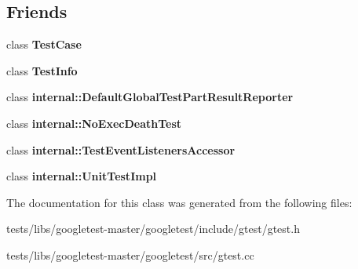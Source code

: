 \subsection*{Friends}
\begin{DoxyCompactItemize}
\item 
\mbox{\label{classtesting_1_1TestEventListeners_aff779e55b06adfa7c0088bd10253f0f0}} 
class {\bfseries Test\+Case}
\item 
\mbox{\label{classtesting_1_1TestEventListeners_a4c49c2cdb6c328e6b709b4542f23de3c}} 
class {\bfseries Test\+Info}
\item 
\mbox{\label{classtesting_1_1TestEventListeners_abae39633da9932847b41cb80efd62115}} 
class {\bfseries internal\+::\+Default\+Global\+Test\+Part\+Result\+Reporter}
\item 
\mbox{\label{classtesting_1_1TestEventListeners_afddba49fdf3f493532b4d5efb9814f4e}} 
class {\bfseries internal\+::\+No\+Exec\+Death\+Test}
\item 
\mbox{\label{classtesting_1_1TestEventListeners_addbc107b6b445617c880182bd4f44cf9}} 
class {\bfseries internal\+::\+Test\+Event\+Listeners\+Accessor}
\item 
\mbox{\label{classtesting_1_1TestEventListeners_acc0a5e7573fd6ae7ad1878613bb86853}} 
class {\bfseries internal\+::\+Unit\+Test\+Impl}
\end{DoxyCompactItemize}


The documentation for this class was generated from the following files\+:\begin{DoxyCompactItemize}
\item 
tests/libs/googletest-\/master/googletest/include/gtest/gtest.\+h\item 
tests/libs/googletest-\/master/googletest/src/gtest.\+cc\end{DoxyCompactItemize}
